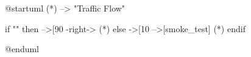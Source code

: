 @startuml
(*) --> "Traffic Flow"

if "" then
  -->[90%
  -right-> (*)
else
  ->[10%
  -->[smoke_test] (*)
endif

@enduml
